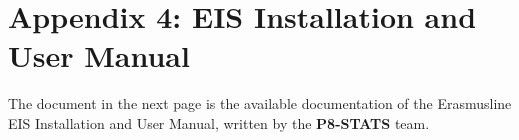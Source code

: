 \chapter{Appendix 4: EIS Installation and User Manual}
The document in the next page is the available documentation of the Erasmusline
EIS Installation and User Manual, written by the \textbf{P8-STATS} team.
